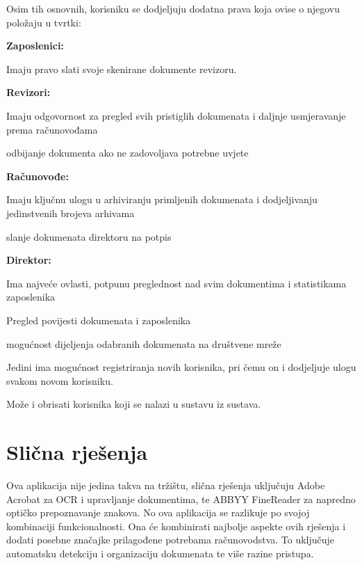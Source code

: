 		Osim tih osnovnih, korisniku se dodjeljuju dodatna prava koja ovise o njegovu položaju u tvrtki:
		\begin{packed_item}
			\item \textbf{Zaposlenici:} 
					\begin{packed_item}
						\item Imaju pravo slati svoje skenirane dokumente revizoru.
					\end{packed_item}
			\item \textbf{Revizori:} 
					\begin{packed_item}
						\item Imaju odgovornost za pregled svih pristiglih dokumenata i daljnje usmjeravanje prema računovođama
						\item odbijanje dokumenta ako ne zadovoljava potrebne uvjete 
					\end{packed_item}
			\item \textbf{Računovođe:} 
						\begin{packed_item}
						\item Imaju ključnu ulogu u arhiviranju primljenih dokumenata i dodjeljivanju jedinstvenih brojeva arhivama
						\item slanje dokumenata direktoru na potpis
					\end{packed_item}
			\item \textbf{Direktor:}
						\begin{packed_item} 
							\item Ima najveće ovlasti, potpunu preglednost nad svim dokumentima i statistikama zaposlenika
							\item Pregled povijesti dokumenata i zaposlenika
							\item mogućnost dijeljenja odabranih dokumenata na društvene mreže
							\item Jedini ima mogućnost registriranja novih korisnika, pri čemu on i dodjeljuje ulogu svakom novom korisniku. 
							\item Može i obrisati korisnika koji se nalazi u sustavu iz sustava.
						\end{packed_item}
		\end{packed_item}
		
		\section{Slična rješenja}
		
		Ova aplikacija nije jedina takva na tržištu, slična rješenja uključuju Adobe Acrobat za OCR i upravljanje dokumentima, te ABBYY FineReader za napredno optičko prepoznavanje znakova. No ova aplikacija se razlikuje po svojoj kombinaciji funkcionalnosti. Ona će kombinirati najbolje aspekte ovih rješenja i dodati posebne značajke prilagođene potrebama računovodstva. To uključuje automatsku detekciju i organizaciju dokumenata te više razine pristupa.

